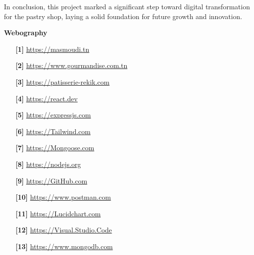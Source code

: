In conclusion, this project marked a significant step toward digital transformation for the pastry shop, laying a solid foundation for future growth and innovation.

\newpage
{}
\begin{center}
    {\huge \textbf{Webography}}\\
\end{center}

\vspace{1cm}


\begin{itemize}
  \item [\textbf{[1]}] \href{https://masmoudi.tn}{https://masmoudi.tn}
  \item [\textbf{[2]}] \href{https://www.gourmandise.com.tn}{https://www.gourmandise.com.tn}
  \item [\textbf{[3]}] \href{https://patisserie-rekik.com}{https://patisserie-rekik.com}
  \item [\textbf{[4]}] \href{https://react.dev}{https://react.dev}
  \item [\textbf{[5]}] \href{https://expressjs.com}{https://expressjs.com}
  \item [\textbf{[6]}] \href{https://Tailwind.com}{https://Tailwind.com}
  \item [\textbf{[7]}] \href{https://Mongoose.com}{https://Mongoose.com}
  \item [\textbf{[8]}] \href{https://nodejs.org}{https://nodejs.org}
  \item [\textbf{[9]}] \href{https://GitHub.com}{https://GitHub.com}
  \item [\textbf{[10]}] \href{https://www.postman.com}{https://www.postman.com}
  \item [\textbf{[11]}] \href{https://Lucidchart.com}{https://Lucidchart.com}
  \item [\textbf{[12]}] \href{https://Visual.Studio.Code}{https://Visual.Studio.Code}
  \item [\textbf{[13]}] \href{https://www.mongodb.com}{https://www.mongodb.com}
\end{itemize}
